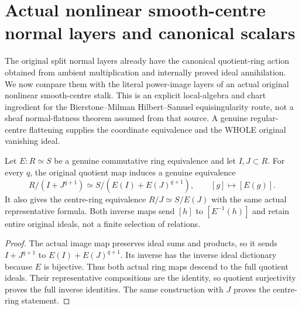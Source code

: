 \section{Actual nonlinear smooth-centre normal layers and canonical scalars}

The original split normal layers already have the canonical quotient-ring
action obtained from ambient multiplication and internally proved ideal
annihilation. We now compare them with the literal power-image layers of
an actual original nonlinear smooth-centre stalk. This is an explicit
local-algebra and chart ingredient for the Bierstone--Milman
Hilbert--Samuel equisingularity route, not a sheaf normal-flatness theorem
assumed from that source. A genuine regular-centre flattening supplies
the coordinate equivalence and the WHOLE original vanishing ideal.

\begin{lemma}
\label{hir:nonlinear-centre-actual-power-quotient}
\leanok
Let $E:R\simeq S$ be a genuine commutative ring equivalence and let
$I,J\subset R$. For every $q$, the original quotient map induces a
genuine equivalence
\[
 R/(I+J^{q+1})\simeq
 S/(E(I)+E(J)^{q+1}),\qquad [g]\longmapsto[E(g)].
\]
It also gives the centre-ring equivalence $R/J\simeq S/E(J)$ with the
same actual representative formula. Both inverse maps send $[h]$ to
$[E^{-1}(h)]$ and retain entire original ideals, not a finite selection
of relations.
\end{lemma}
\begin{proof}
The actual image map preserves ideal sums and products, so it sends
$I+J^{q+1}$ to $E(I)+E(J)^{q+1}$. Its inverse has the inverse ideal
dictionary because $E$ is bijective. Thus both actual ring maps descend
to the full quotient ideals. Their representative compositions are the
identity, so quotient surjectivity proves the full inverse identities.
The same construction with $J$ proves the centre-ring statement.
\end{proof}

